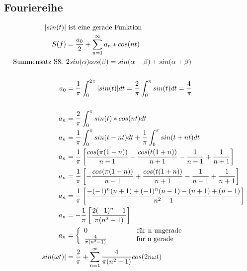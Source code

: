 \subsection{Fouriereihe}
\begin{center}
  \begin{align*}
    |sin(t)| & \text{ ist eine gerade Funktion} \\
    S(f) &= \frac{a_0}{2} + \sum_{n=1}^{\infty} a_n * cos(nt) \\
    \text{Summensatz S8: } & 2sin(\alpha)cos(\beta) = sin(\alpha-\beta)+sin(\alpha+\beta) \\ \\
    a_0 &= \frac{1}{\pi}\int_0^{2\pi} |sin(t)| dt = \frac{2}{\pi}\int_0^{\pi} sin(t) dt = \frac{4}{\pi} \\ \\
    a_n &= \frac{2}{\pi}\int_0^{\pi} sin(t) * cos (nt) dt \\
    a_n &= \frac{1}{\pi}\int_0^{\pi} sin(t - nt) dt +  \frac{1}{\pi}\int_0^{\pi} sin(t + nt) dt\\
    a_n &= \frac{1}{\pi} \left[ \frac{cos(\pi(1-n))}{n-1} - \frac{cos(t(1+n))}{n+1} - \frac{1}{n-1} + \frac{1}{n+1} \right] \\
    a_n &= \frac{1}{\pi} \left[ -\frac{cos(\pi(1-n))}{n-1} + \frac{cos(t(1+n))}{n+1} - \frac{1}{n-1} + \frac{1}{n+1} \right] \\
    a_n &= \frac{1}{\pi} \left[ \frac{-(-1)^n (n+1) + (-1)^n (n-1) - (n+1) + (n-1)}{n^2-1} \right] \\
    a_n &= -\frac{1}{\pi} \left[ \frac{2(-1)^n + 1}{\pi(n^2-1)} \right] \\
    a_n &= \left\{\begin{array}{ll}
            0                     \hspace{2.5cm} \text{f\"ur n ungerade}\\
            \frac{4}{\pi(n^2-1)} \hspace{1.5cm} \text{f\"ur n gerade}
            \end{array}\right. \\
    |sin(\omega t)| &= \frac{2}{\pi} + \sum_{n=1}^{\infty}\frac{4}{\pi(n^2-1)} cos(2n\omega t)
  \end{align*}
\end{center}

